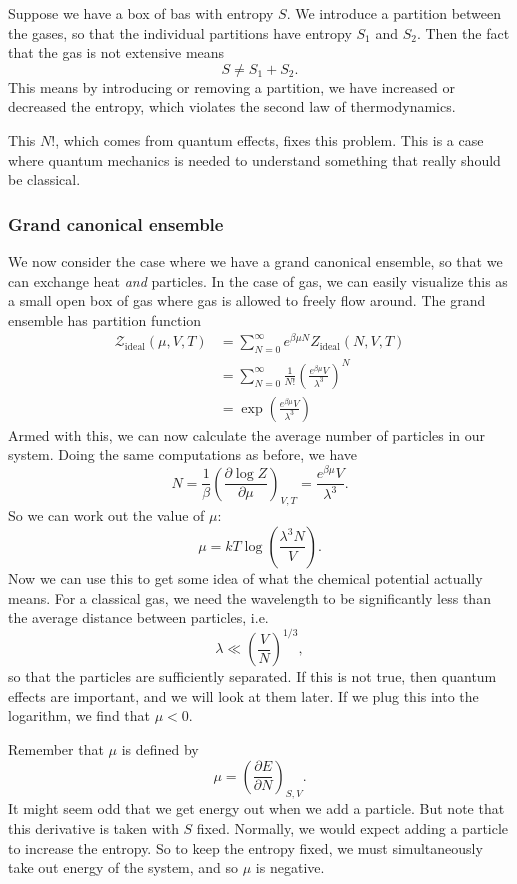 \documentclass[a4paper]{article}
\begin{document}
Suppose we have a box of bas with entropy $S$. We introduce a partition between the gases, so that the individual partitions have entropy $S_1$ and $S_2$. Then the fact that the gas is not extensive means
\[
  S \not= S_1 + S_2.
\]
This means by introducing or removing a partition, we have increased or decreased the entropy, which violates the second law of thermodynamics.

This $N!$, which comes from quantum effects, fixes this problem. This is a case where quantum mechanics is needed to understand something that really should be classical.

\subsubsection*{Grand canonical ensemble}
We now consider the case where we have a grand canonical ensemble, so that we can exchange heat \emph{and} particles. In the case of gas, we can easily visualize this as a small open box of gas where gas is allowed to freely flow around. The grand ensemble has partition function
\begin{align*}
  \mathcal{Z}_{\mathrm{ideal}}(\mu, V, T) &= \sum_{N = 0}^\infty e^{\beta \mu N} Z_{\mathrm{ideal}}(N, V, T) \\
  &= \sum_{N = 0}^\infty \frac{1}{N!} \left(\frac{e^{\beta \mu} V}{\lambda^3}\right)^N\\
  &= \exp\left(\frac{e^{\beta \mu}V}{\lambda^3}\right)
\end{align*}
Armed with this, we can now calculate the average number of particles in our system. Doing the same computations as before, we have
\[
  N = \frac{1}{\beta} \left(\frac{\partial \log Z}{\partial \mu}\right)_{V, T} = \frac{e^{\beta \mu}V}{\lambda^3}.
\]
So we can work out the value of $\mu$:
\[
  \mu = kT \log \left(\frac{\lambda^3 N}{V}\right).
\]
Now we can use this to get some idea of what the chemical potential actually means. For a classical gas, we need the wavelength to be significantly less than the average distance between particles, i.e.
\[
  \lambda \ll \left(\frac{V}{N}\right)^{1/3},
\]
so that the particles are sufficiently separated. If this is not true, then quantum effects are important, and we will look at them later. If we plug this into the logarithm, we find that $\mu < 0$.

Remember that $\mu$ is defined by
\[
  \mu = \left(\frac{\partial E}{\partial N}\right)_{S, V}.
\]
It might seem odd that we get energy out when we add a particle. But note that this derivative is taken with $S$ fixed. Normally, we would expect adding a particle to increase the entropy. So to keep the entropy fixed, we must simultaneously take out energy of the system, and so $\mu$ is negative.
\end{document}

